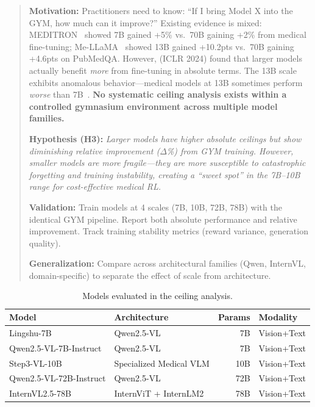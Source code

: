 \documentclass{article}
\begin{document}
\begin{quote}
\textbf{Motivation:} Practitioners need to know: ``If I bring Model X into the GYM, how much can it improve?'' Existing evidence is mixed: MEDITRON~\citep{chen2023meditron} showed 7B gained +5\% vs.\ 70B gaining +2\% from medical fine-tuning; Me-LLaMA~\citep{xie2024mellama} showed 13B gained +10.2pts vs.\ 70B gaining +4.6pts on PubMedQA. However, \citet{zhang2024scaling} (ICLR 2024) found that larger models actually benefit \emph{more} from fine-tuning in absolute terms. The 13B scale exhibits anomalous behavior---medical models at 13B sometimes perform \emph{worse} than 7B~\citep{kim2024medexqa}. \textbf{No systematic ceiling analysis exists within a controlled gymnasium environment across multiple model families.}

\textbf{Hypothesis (H3):} \textit{Larger models have higher absolute ceilings but show diminishing relative improvement ($\Delta$\%) from GYM training. However, smaller models are more fragile---they are more susceptible to catastrophic forgetting and training instability, creating a ``sweet spot'' in the 7B--10B range for cost-effective medical RL.}

\textbf{Validation:} Train models at 4 scales (7B, 10B, 72B, 78B) with the identical GYM pipeline. Report both absolute performance and relative improvement. Track training stability metrics (reward variance, generation quality).

\textbf{Generalization:} Compare across architectural families (Qwen, InternVL, domain-specific) to separate the effect of scale from architecture.
\end{quote}

\begin{table}[t]
\centering
\caption{Models evaluated in the ceiling analysis.}
\label{tab:models}
\begin{tabular}{llrl}
\toprule
\textbf{Model} & \textbf{Architecture} & \textbf{Params} & \textbf{Modality} \\
\midrule
Lingshu-7B & Qwen2.5-VL & 7B & Vision+Text \\
Qwen2.5-VL-7B-Instruct & Qwen2.5-VL & 7B & Vision+Text \\
Step3-VL-10B & Specialized Medical VLM & 10B & Vision+Text \\
Qwen2.5-VL-72B-Instruct & Qwen2.5-VL & 72B & Vision+Text \\
InternVL2.5-78B & InternViT + InternLM2 & 78B & Vision+Text \\
\bottomrule
\end{tabular}
\end{table}
\end{document}
